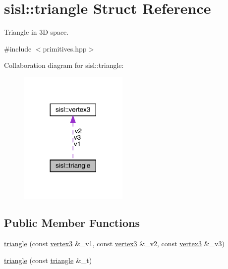 \hypertarget{structsisl_1_1triangle}{}\section{sisl\+:\+:triangle Struct Reference}
\label{structsisl_1_1triangle}


Triangle in 3D space.  




{\ttfamily \#include $<$primitives.\+hpp$>$}



Collaboration diagram for sisl\+:\+:triangle\+:\nopagebreak
\begin{figure}[H]
\begin{center}
\leavevmode
\includegraphics[width=149pt]{structsisl_1_1triangle__coll__graph}
\end{center}
\end{figure}
\subsection*{Public Member Functions}
\begin{DoxyCompactItemize}
\item 
\hyperlink{structsisl_1_1triangle_a0e0dcd17f1c5e16ecb79daceb604c19a}{triangle} (const \hyperlink{structsisl_1_1vertex3}{vertex3} \&\+\_\+v1, const \hyperlink{structsisl_1_1vertex3}{vertex3} \&\+\_\+v2, const \hyperlink{structsisl_1_1vertex3}{vertex3} \&\+\_\+v3)
\item 
\hyperlink{structsisl_1_1triangle_adae1a504fbc6782f22a434897ad39b1c}{triangle} (const \hyperlink{structsisl_1_1triangle}{triangle} \&\+\_\+t)
\end{DoxyCompactItemize}
